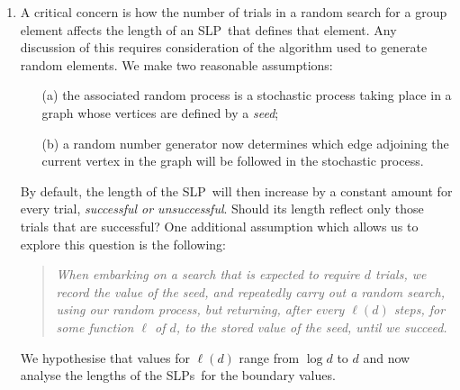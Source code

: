 \documentclass[12pt]{article}
\def\SLP{{\rm SLP}}
\def\SLPs{{\rm SLPs}}
\begin{document}
\begin{enumerate}
\item 
A critical concern is how the number of trials in a random search for 
a group element affects the length of an \SLP\ that defines that element.  
Any discussion of this requires consideration of the algorithm
used to generate random elements.  We make two reasonable assumptions:
\begin{enumerate}
\item[(a)] the associated random process is a stochastic process taking place 
in a graph whose vertices are defined by a {\it seed};
\item[(b)] a random number generator now determines which 
edge adjoining the current vertex in the graph will be followed in 
the stochastic process.  
\end{enumerate}
By default, the length of the \SLP\ will then increase by a constant amount 
for every trial, {\it successful or unsuccessful}.  
Should its length reflect only those trials that are successful? 
One additional assumption which allows us to explore this question is 
the following: 
\begin{quotation}
\noindent 
{\it 
When embarking on a search that is expected to require $d$ trials, 
we record the value of the seed, and repeatedly carry
out a random search, using our random process, but returning, after 
every $\ell (d)$ steps, for some function $\ell$ of $d$, to the 
stored value of the seed, until we succeed.
}
\end{quotation}
We hypothesise that values for $\ell(d)$ range from $\log d$ to $d$ 
and now analyse the lengths of the \SLPs\ for the boundary values. 
\end{enumerate}
\end{document}
